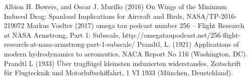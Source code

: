 \documentclass{report}
\begin{document}
\begin{thebibliography}{99}
 Albion H. Bowers, and Oscar J. Murillo (2016) On Wings of the Minimum Induced Drag:  Spanload Implications for Aircraft and Birds, NASA/TP-2016-219072
 Markus Voelter (2017) omega tau podcast number 256 – Flight Research at NASA Armstrong, Part 1: Subscale, http://omegataupodcast.net/256-flight-research-at-nasa-armstrong-part-1-subscale/
 Prandtl, L.  (1921)  Applications  of  modern hydrodynamics  to  aeronautics,  NACA  Report  No  116 (Washington, DC).
 Prandtl L (1933) Über tragfl\"ugel kleinsten induzierten widerstandes. Zeitschrift für Flugtecknik und Motorluftschiffahrt, 1 VI 1933 (M\"unchen, Deustchland).
\end{thebibliography}
\end{document}
